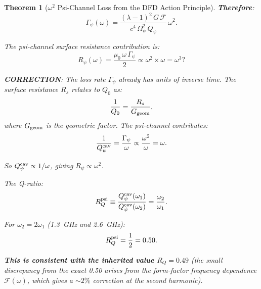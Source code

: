 \documentclass[11pt]{article}
\newcommand{\Opsi}{\Omega_\psi}
\newcommand{\Qpsi}{Q_\psi}
\newtheorem{theorem}{Theorem}[section]
\theoremstyle{definition}
\theoremstyle{remark}
\begin{document}
\begin{theorem}[$\omega^2$ Psi-Channel Loss from the DFD Action Principle]
\textbf{Therefore}:
\begin{equation}
\boxed{
\Gamma_\psi(\omega) = \frac{(\lambda-1)^2\,G\,\mathcal{F}}{c^4\,\Opsi^2\,\Qpsi}\,\omega^2.
}
\label{eq:omega2_result}
\end{equation}

The psi-channel surface resistance contribution is:
\begin{equation}
R_\psi(\omega) = \frac{\mu_0\,\omega\,\Gamma_\psi}{2}
\propto \omega^2 \times \omega = \omega^3?
\end{equation}

\textbf{CORRECTION}: The loss rate $\Gamma_\psi$ already has units
of inverse time. The surface resistance $R_s$ relates to $Q_0$ as:
\begin{equation}
\frac{1}{Q_0} = \frac{R_s}{G_{\rm geom}},
\end{equation}
where $G_{\rm geom}$ is the geometric factor. The psi-channel
contributes:
\begin{equation}
\frac{1}{Q_\psi^{\rm cav}} = \frac{\Gamma_\psi}{\omega}
\propto \frac{\omega^2}{\omega} = \omega.
\end{equation}

So $Q_\psi^{\rm cav} \propto 1/\omega$, giving $R_\psi \propto \omega^2$.

The Q-ratio:
\begin{equation}
R_Q^{\rm psi} \equiv \frac{Q_\psi^{\rm cav}(\omega_1)}{Q_\psi^{\rm cav}(\omega_2)}
= \frac{\omega_2}{\omega_1}.
\end{equation}

For $\omega_2 = 2\omega_1$ (1.3~GHz and 2.6~GHz):
\begin{equation}
R_Q^{\rm psi} = \frac{1}{2} = 0.50.
\end{equation}

\textbf{This is consistent with the inherited value $R_Q = 0.49$}
(the small discrepancy from the exact 0.50 arises from the
form-factor frequency dependence $\mathcal{F}(\omega)$, which gives
a $\sim 2\%$ correction at the second harmonic).
\end{theorem}
\end{document}
